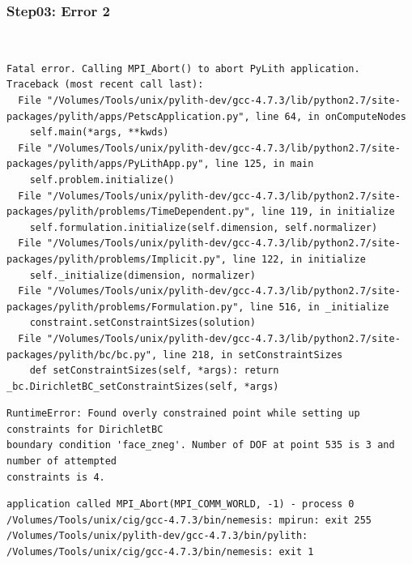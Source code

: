 \documentclass{beamer}
\begin{document}
\begin{frame}[fragile]
  \frametitle{Step03: Error 2}

\\
\begin{lstlisting}
Fatal error. Calling MPI_Abort() to abort PyLith application.
Traceback (most recent call last):
  File "/Volumes/Tools/unix/pylith-dev/gcc-4.7.3/lib/python2.7/site-packages/pylith/apps/PetscApplication.py", line 64, in onComputeNodes
    self.main(*args, **kwds)
  File "/Volumes/Tools/unix/pylith-dev/gcc-4.7.3/lib/python2.7/site-packages/pylith/apps/PyLithApp.py", line 125, in main
    self.problem.initialize()
  File "/Volumes/Tools/unix/pylith-dev/gcc-4.7.3/lib/python2.7/site-packages/pylith/problems/TimeDependent.py", line 119, in initialize
    self.formulation.initialize(self.dimension, self.normalizer)
  File "/Volumes/Tools/unix/pylith-dev/gcc-4.7.3/lib/python2.7/site-packages/pylith/problems/Implicit.py", line 122, in initialize
    self._initialize(dimension, normalizer)
  File "/Volumes/Tools/unix/pylith-dev/gcc-4.7.3/lib/python2.7/site-packages/pylith/problems/Formulation.py", line 516, in _initialize
    constraint.setConstraintSizes(solution)
  File "/Volumes/Tools/unix/pylith-dev/gcc-4.7.3/lib/python2.7/site-packages/pylith/bc/bc.py", line 218, in setConstraintSizes
    def setConstraintSizes(self, *args): return _bc.DirichletBC_setConstraintSizes(self, *args)
\end{lstlisting}
\begin{lstlisting}
RuntimeError: Found overly constrained point while setting up constraints for DirichletBC
boundary condition 'face_zneg'. Number of DOF at point 535 is 3 and number of attempted
constraints is 4.
\end{lstlisting}
\begin{lstlisting}
application called MPI_Abort(MPI_COMM_WORLD, -1) - process 0
/Volumes/Tools/unix/cig/gcc-4.7.3/bin/nemesis: mpirun: exit 255
/Volumes/Tools/unix/pylith-dev/gcc-4.7.3/bin/pylith:
/Volumes/Tools/unix/cig/gcc-4.7.3/bin/nemesis: exit 1
\end{lstlisting}

\end{frame}
\end{document}
